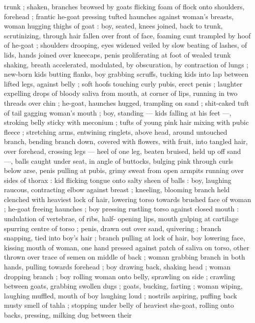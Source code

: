 trunk ; shaken, branches browsed by goats flicking foam of flock 
onto shoulders, forehead ; frantic he-goat pressing tufted haunches 
against woman's breasts, woman hugging thighs of goat : boy, 
seated, knees joined, back to trunk, scrutinizing, through hair fallen 
over front of face, foaming cunt trampled by hoof of he-goat ; 
shoulders drooping, eyes widened veiled by slow beating of lashes, 
of lids, hands joined over kneecaps, penis proliferating at foot of 
wealed trunk shaking, breath accelerated, modulated, by 
obscuration, by contraction of lungs ; new-born kids butting flanks, 
boy grabbing scruffs, tucking kids into lap between lifted legs, 
against belly ; soft hoofs touching curly pubis, erect penis ; laughter 
expelling drops of bloody saliva from mouth, at corner of lips, 
running in two threads over chin ; he-goat, haunches hugged, 
trampling on sand ; shit-caked tuft of tail gagging woman's mouth ; 
boy, standing --- kids falling at his feet ---, stroking belly sticky with 
meconium ; tufts of young pink hair mixing with pubic fleece ; 
stretching arms, entwining ringlets, above head, around untouched 
branch, bending branch down, covered with flowers, with fruit, into 
tangled hair, over forehead, crossing legs --- heel of one leg, beaten 
bruised, held up off sand ---, balls caught under seat, in angle of 
buttocks, bulging pink through curls below arse, penis pulling at 
pubis, grimy sweat from open armpits running over sides of thorax : 
kid flicking tongue onto salty sheen of balls : boy, laughing raucous, 
contracting elbow against breast ; kneeling, blooming branch held 
clenched with heaviest lock of hair, lowering torso towards brushed 
face of woman ; he-goat freeing haunches ; boy pressing rustling 
torso against closed mouth : undulation of vertebrae, of ribs, half- 
opening lips, mouth gulping at cartilage spurring centre of torso ; 
penis, drawn out over sand, quivering ; branch snapping, tied into 
boy's hair ; branch pulling at lock of hair, boy lowering face, kissing 
mouth of woman, one hand pressed against patch of saliva on torso, 
other thrown over trace of semen on middle of back ; woman 
grabbing branch in both hands, pulling towards forehead ; boy 
drawing back, shaking head ; woman dropping branch ; boy rolling 
woman onto belly, sprawling on side ; crawling between goats, 
grabbing swollen dugs ; goats, bucking, farting ; woman wiping, 
laughing muffled, mouth of boy laughing loud ; nostrils aspiring, 
puffing back musty smell of tahla ; stopping under belly of heaviest 
she-goat, rolling onto backs, pressing, milking dug between their 
